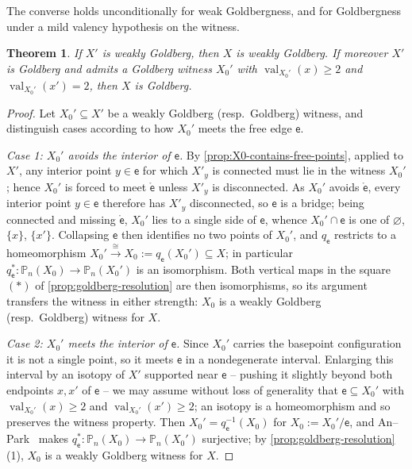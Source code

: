 \documentclass[reqno]{amsart}
\newtheorem{theorem}{Theorem}[section]
\theoremstyle{definition}
\newcommand\sfe{\mathsf{e}}
\newcommand{\PB}{\mathbb{P}}
\DeclareMathOperator{\val}{val}
\numberwithin{equation}{section}
\begin{document}
The converse holds unconditionally for weak Goldbergness, and for
Goldbergness under a mild valency hypothesis on the witness.

\begin{theorem}\label{thm:resolution-reflects-goldberg}
If \(X'\) is weakly Goldberg, then \(X\) is weakly Goldberg. If
moreover \(X'\) is Goldberg and admits a Goldberg witness \(X_0'\) with
\(\val_{X_0'}(x)\ge 2\) and \(\val_{X_0'}(x')=2\), then \(X\) is Goldberg.
\end{theorem}

\begin{proof}
Let \(X_0'\subseteq X'\) be a weakly Goldberg (resp.\ Goldberg)
witness, and distinguish cases according to how \(X_0'\) meets the
free edge \(\sfe\).

\emph{Case 1: \(X_0'\) avoids the interior of \(\sfe\).} By
\cref{prop:X0-contains-free-points}, applied to \(X'\), any interior
point \(y\in \sfe\) for which \(X'_y\) is connected must lie in the witness
\(X_0'\); hence \(X_0'\) is forced to meet \(\mathring{\sfe}\) unless
\(X'_y\) is disconnected. As \(X_0'\) avoids \(\mathring{\sfe}\), every
interior point \(y\in \sfe\) therefore has \(X'_y\) disconnected, so \(\sfe\)
is a bridge; being connected and missing \(\mathring{\sfe}\), \(X_0'\)
lies to a single side of \(\sfe\), whence \(X_0'\cap \sfe\) is one of
\(\varnothing\), \(\{x\}\), \(\{x'\}\). Collapsing \(\sfe\) then identifies
no two points of \(X_0'\), and \(q_\sfe\) restricts to a homeomorphism
\(X_0'\xrightarrow{\cong}X_0:=q_\sfe(X_0')\subseteq X\); in particular
\(q_\sfe^\ast\colon\PB_n(X_0)\to\PB_n(X_0')\) is an isomorphism. Both
vertical maps in the square \((\ast)\) of
\cref{prop:goldberg-resolution} are then isomorphisms, so its argument
transfers the witness in either strength: \(X_0\) is a weakly Goldberg
(resp.\ Goldberg) witness for \(X\).

\emph{Case 2: \(X_0'\) meets the interior of \(\sfe\).} Since \(X_0'\)
carries the basepoint configuration it is not a single point, so it
meets \(\sfe\) in a nondegenerate interval. Enlarging this interval by an
isotopy of \(X'\) supported near \(\sfe\) -- pushing it slightly beyond
both endpoints \(x,x'\) of \(\sfe\) -- we may assume without loss of
generality that \(\sfe\subseteq X_0'\) with \(\val_{X_0'}(x)\geq 2\) and
\(\val_{X_0'}(x')\geq 2\); an isotopy is a homeomorphism and so
preserves the witness property. Then \(X_0'=q_\sfe^{-1}(X_0)\) for
\(X_0:=X_0'/\sfe\), and An--Park~\cite[Prop.~3.1]{AnPark2017} makes
\(q_\sfe^\ast\colon\PB_n(X_0)\to\PB_n(X_0')\) surjective; by
\cref{prop:goldberg-resolution}(1), \(X_0\) is a weakly Goldberg
witness for \(X\).


\end{proof}
\end{document}
